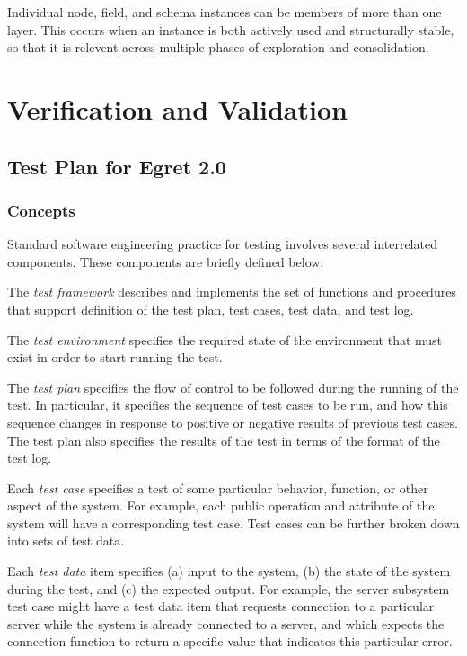Individual node, field, and schema instances can be members of more than
one layer.  This occurs when an instance is both actively used and 
structurally stable, so that it is relevent across multiple phases
of exploration and consolidation.

\chapter{Verification and Validation}
\section{Test Plan for Egret 2.0}

\subsection{Concepts}

Standard software engineering practice for testing involves several
interrelated components. These components are briefly defined below:

The {\em test framework} describes and implements the set of functions
and procedures that support definition of the test plan, test cases,
test data, and test log.

The {\em test environment} specifies the required state of the environment
that must exist in order to start running the test.

The {\em test plan} specifies the flow of control to be followed during 
the running of the test. In particular, it specifies the sequence of test
cases to be run, and how this sequence changes in response to positive or 
negative results of previous test cases.  The test plan also specifies the 
results of the test in terms of the format of the test log.

Each {\em test case} specifies a test of some particular behavior, 
function, or other aspect of the system.  For example, each public operation
and attribute of the system will have a corresponding test case.  Test
cases can be further broken down into sets of test data.

Each {\em test data} item specifies (a) input to the system, (b) the
state of the system during the test, and (c) the expected output.  For
example, the server subsystem test case might have a test data item
that requests connection to a particular server while the system is already
connected to a server, and which expects the connection function to return 
a specific value that indicates this particular error. 


